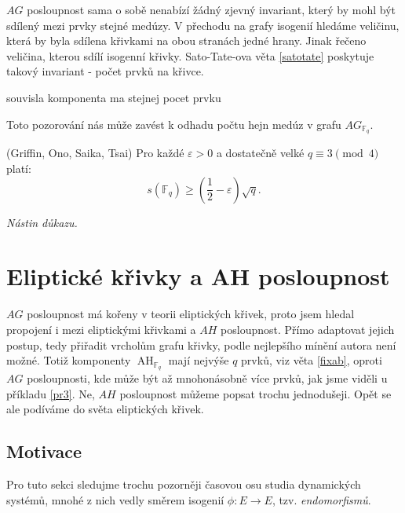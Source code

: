 \documentclass[12pt]{report}
\DeclareMathOperator{\AH}{AH}
\begin{document}
$AG$ posloupnost sama o sobě nenabízí žádný zjevný invariant, který by mohl být sdílený mezi prvky stejné medúzy. V přechodu na grafy isogenií hledáme veličinu, která by byla sdílena křivkami na obou stranách jedné hrany. Jinak řečeno veličina, kterou sdílí isogenní křivky. Sato-Tate-ova věta \ref{satotate} poskytuje takový invariant - počet prvků na křivce. 

\begin{veta}
souvisla komponenta ma stejnej pocet prvku
\end{veta}


Toto pozorování nás může zavést k odhadu počtu hejn medúz v grafu $AG_{\mathbb{F}_q}$.


\begin{veta}(Griffin, Ono, Saika, Tsai)
Pro každé $\varepsilon>0$ a dostatečně velké $q \equiv 3 \pmod{4}$ platí:
$$s(\mathbb{F}_q) \geqslant \left(\frac{1}{2} - \varepsilon \right) \sqrt{q}.$$
\end{veta}
\noindent \textit{Nástin důkazu.}



\chapter{Eliptické křivky a AH posloupnost}\label{5}

$AG$ posloupnost má kořeny v teorii eliptických křivek, proto jsem hledal propojení i mezi eliptickými křivkami a $AH$ posloupnost.
Přímo adaptovat jejich postup, tedy přiřadit vrcholům grafu křivky, podle nejlepšího mínění autora není možné. Totiž komponenty $\AH_{\mathbb{F}_q}$ mají nejvýše $q$ prvků, viz věta \ref{fixab}, oproti $AG$ posloupnosti, kde může být až mnohonásobně více prvků, jak jsme viděli u příkladu \ref{pr3}. Ne, $AH$ posloupnost můžeme popsat trochu jednodušeji. Opět se ale podíváme do světa eliptických křivek. 

\section{Motivace}

Pro tuto sekci sledujme trochu pozorněji časovou osu studia dynamických systémů, mnohé z nich vedly směrem isogenií $\phi : E \longrightarrow E$, tzv. \textit{endomorfismů}.
\end{document}

